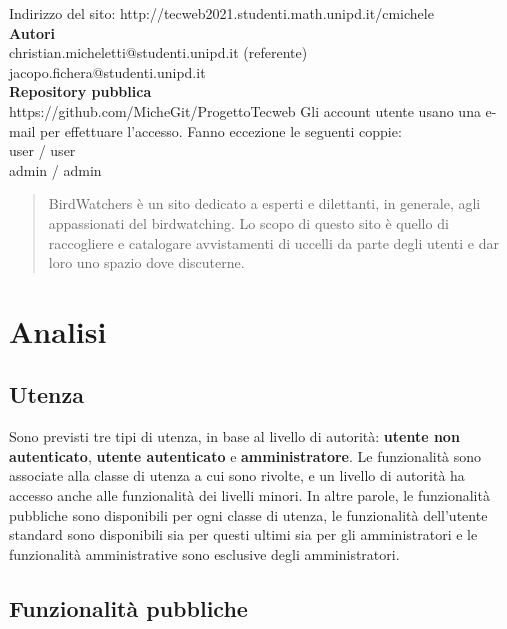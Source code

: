 \documentclass[12pt, a4paper]{article}
\begin{document}
\begin{titlepage}
\begin{center}
Indirizzo del sito: http://tecweb2021.studenti.math.unipd.it/cmichele \\
\textbf{Autori} \\
christian.micheletti@studenti.unipd.it (referente) \\
jacopo.fichera@studenti.unipd.it \\
\textbf{Repository pubblica} \\
https://github.com/MicheGit/ProgettoTecweb
\vfill
Gli account utente usano una e-mail per effettuare l'accesso. Fanno eccezione le seguenti coppie: \\
user / user \\
admin / admin
\end{center}
\end{titlepage}

\newpage

\tableofcontents

\newpage

\begin{abstract}
BirdWatchers è un sito dedicato a esperti e dilettanti, in generale, agli appassionati del birdwatching. Lo scopo di questo sito è quello di raccogliere e catalogare avvistamenti di uccelli da parte degli utenti e dar loro uno spazio dove discuterne. 
\end{abstract}

\newpage
\section{Analisi}
\subsection{Utenza}
Sono previsti tre tipi di utenza, in base al livello di autorità: \textbf{utente non autenticato}, \textbf{utente autenticato} e \textbf{amministratore}. Le funzionalità sono associate alla classe di utenza a cui sono rivolte, e un livello di autorità ha accesso anche alle funzionalità dei livelli minori. In altre parole, le funzionalità pubbliche sono disponibili per ogni classe di utenza, le funzionalità dell'utente standard sono disponibili sia per questi ultimi sia per gli amministratori e le funzionalità amministrative sono esclusive degli amministratori.
\subsection{Funzionalità pubbliche}
\end{document}
